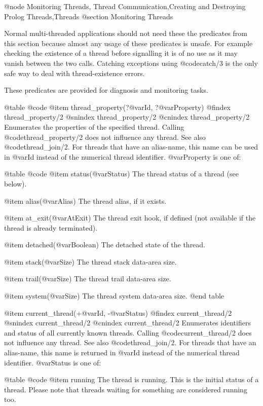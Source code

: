 @node Monitoring Threads, Thread Communication,Creating and Destroying Prolog Threads,Threads
@section Monitoring Threads

Normal multi-threaded applications should not need these the predicates
from this section because almost any usage of these predicates is
unsafe. For example checking the existence of a thread before signalling
it is of no use as it may vanish between the two calls. Catching
exceptions using @code{catch/3} is the only safe way to deal with
thread-existence errors.

These predicates are provided for diagnosis and monitoring tasks.


@table @code
@item thread_property(?@var{Id}, ?@var{Property})
@findex thread_property/2
@snindex thread_property/2
@cnindex thread_property/2
Enumerates the properties of the specified thread.
Calling @code{thread_property/2} does not influence any thread.  See also
@code{thread_join/2}.  For threads that have an alias-name, this name can
be used in @var{Id} instead of the numerical thread identifier.
@var{Property} is one of:

@table @code
    @item status(@var{Status})
The thread status of a thread (see below).

    @item alias(@var{Alias})
The thread alias, if it exists.

    @item at_exit(@var{AtExit})
The thread exit hook, if defined (not available if the thread is already terminated).

    @item detached(@var{Boolean})
The detached state of the thread.

    @item stack(@var{Size})
The thread stack data-area size.

    @item trail(@var{Size})
The thread trail data-area size.

    @item system(@var{Size})
The thread system data-area size.
@end table

@item current_thread(+@var{Id}, -@var{Status})
@findex current_thread/2
@snindex current_thread/2
@cnindex current_thread/2
Enumerates identifiers and status of all currently known threads.
Calling @code{current_thread/2} does not influence any thread.  See also
@code{thread_join/2}.  For threads that have an alias-name, this name is
returned in @var{Id} instead of the numerical thread identifier.
@var{Status} is one of:

@table @code
    @item running
The thread is running.  This is the initial status of a thread.  Please
note that threads waiting for something are considered running too.

